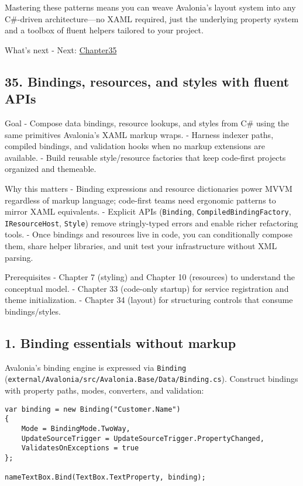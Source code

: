 Mastering these patterns means you can weave Avalonia's layout system
into any C\#-driven architecture---no XAML required, just the underlying
property system and a toolbox of fluent helpers tailored to your
project.

What's next - Next: \href{Chapter35.md}{Chapter35}

\newpage

\subsection{35. Bindings, resources, and styles with fluent
APIs}\label{bindings-resources-and-styles-with-fluent-apis}

Goal - Compose data bindings, resource lookups, and styles from C\#
using the same primitives Avalonia's XAML markup wraps. - Harness
indexer paths, compiled bindings, and validation hooks when no markup
extensions are available. - Build reusable style/resource factories that
keep code-first projects organized and themeable.

Why this matters - Binding expressions and resource dictionaries power
MVVM regardless of markup language; code-first teams need ergonomic
patterns to mirror XAML equivalents. - Explicit APIs
(\passthrough{\lstinline!Binding!},
\passthrough{\lstinline!CompiledBindingFactory!},
\passthrough{\lstinline!IResourceHost!},
\passthrough{\lstinline!Style!}) remove stringly-typed errors and enable
richer refactoring tools. - Once bindings and resources live in code,
you can conditionally compose them, share helper libraries, and unit
test your infrastructure without XML parsing.

Prerequisites - Chapter 7 (styling) and Chapter 10 (resources) to
understand the conceptual model. - Chapter 33 (code-only startup) for
service registration and theme initialization. - Chapter 34 (layout) for
structuring controls that consume bindings/styles.

\subsection{1. Binding essentials without
markup}\label{binding-essentials-without-markup}

Avalonia's binding engine is expressed via
\passthrough{\lstinline!Binding!}
(\passthrough{\lstinline!external/Avalonia/src/Avalonia.Base/Data/Binding.cs!}).
Construct bindings with property paths, modes, converters, and
validation:

\begin{lstlisting}
var binding = new Binding("Customer.Name")
{
    Mode = BindingMode.TwoWay,
    UpdateSourceTrigger = UpdateSourceTrigger.PropertyChanged,
    ValidatesOnExceptions = true
};

nameTextBox.Bind(TextBox.TextProperty, binding);
\end{lstlisting}

